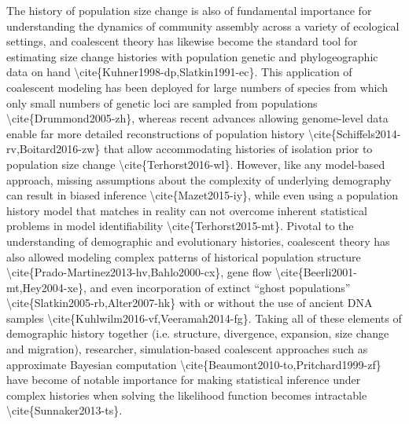 \documentclass[]{article}
\begin{document}
The history of population size change is also of fundamental importance
for understanding the dynamics of community assembly across a variety of
ecological settings, and coalescent theory has likewise become the
standard tool for estimating size change histories with population
genetic and phylogeographic data on hand
\textbackslash{}cite\{Kuhner1998-dp,Slatkin1991-ec\}. This application
of coalescent modeling has been deployed for large numbers of species
from which only small numbers of genetic loci are sampled from
populations \textbackslash{}cite\{Drummond2005-zh\}, whereas recent
advances allowing genome-level data enable far more detailed
reconstructions of population history
\textbackslash{}cite\{Schiffels2014-rv,Boitard2016-zw\} that allow
accommodating histories of isolation prior to population size change
\textbackslash{}cite\{Terhorst2016-wl\}. However, like any model-based
approach, missing assumptions about the complexity of underlying
demography can result in biased inference
\textbackslash{}cite\{Mazet2015-iy\}, while even using a population
history model that matches in reality can not overcome inherent
statistical problems in model identifiability
\textbackslash{}cite\{Terhorst2015-mt\}. Pivotal to the understanding of
demographic and evolutionary histories, coalescent theory has also
allowed modeling complex patterns of historical population structure
\textbackslash{}cite\{Prado-Martinez2013-hv,Bahlo2000-cx\}, gene flow
\textbackslash{}cite\{Beerli2001-mt,Hey2004-xe\}, and even incorporation
of extinct ``ghost populations''
\textbackslash{}cite\{Slatkin2005-rb,Alter2007-hk\} with or without the
use of ancient DNA samples
\textbackslash{}cite\{Kuhlwilm2016-vf,Veeramah2014-fg\}. Taking all of
these elements of demographic history together (i.e. structure,
divergence, expansion, size change and migration), researcher,
simulation-based coalescent approaches such as approximate Bayesian
computation \textbackslash{}cite\{Beaumont2010-to,Pritchard1999-zf\}
have become of notable importance for making statistical inference under
complex histories when solving the likelihood function becomes
intractable \textbackslash{}cite\{Sunnaker2013-ts\}.
\end{document}
